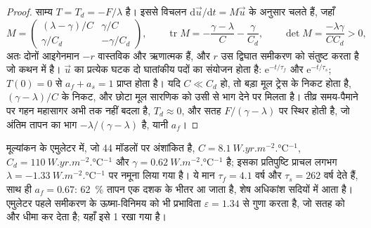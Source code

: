 \begin{proof}
साम्य $T = T_d = -F/\lambda$ है। इससे विचलन
$\mathrm d\vec u/\mathrm dt = M\vec u$ के अनुसार चलते हैं, जहाँ
\[
M = \begin{pmatrix} (\lambda - \gamma)/C & \gamma/C\\ \gamma/C_d &
-\gamma/C_d\end{pmatrix}, \qquad
\operatorname{tr}M = -\frac{\gamma - \lambda}{C} - \frac{\gamma}{C_d},
\qquad \det M = \frac{-\lambda\gamma}{CC_d} > 0 ,
\]
अतः दोनों आइगेनमान $-r$ वास्तविक और ऋणात्मक हैं, और $r$ उस द्विघात समीकरण को संतुष्ट करता है
जो कथन में है। $\vec u$ का प्रत्येक घटक दो घातांकीय पदों का संयोजन होता है: $\mathrm
e^{-t/\tau_f}$ और $\mathrm e^{-t/\tau_s}$; $T(0) = 0$ से $a_f + a_s =
1$ प्राप्त होता है। यदि $C \ll C_d$ हो, तो बड़ा मूल ट्रेस के निकट होता है, $(\gamma -
\lambda)/C$ के निकट, और छोटा मूल सारणिक को उसी से भाग देने पर मिलता है। तीव्र
समय-पैमाने पर गहन महासागर अभी तक नहीं बदला है, $T_d \approx 0$, और सतह
$F/(\gamma - \lambda)$ पर स्थिर होती है, जो अंतिम तापन का
भाग $-\lambda/(\gamma - \lambda)$ है, यानी $a_f$।
\end{proof}

मूल्यांकन के एमुलेटर में, जो 44 मॉडलों पर अंशांकित है, $C =
\qty{8.1}{W.yr.m^{-2}.\celsius^{-1}}$, $C_d = \qty{110}{W.yr.m^{-2}.\celsius^{-1}}$
और $\gamma = \qty{0.62}{W.m^{-2}.\celsius^{-1}}$ है; इसका प्रतिपुष्टि प्राचल
लगभग $\lambda = \qty{-1.33}{W.m^{-2}.\celsius^{-1}}$ पर नमूना लिया गया है। ये मान
$\tau_f = \num{4.1}\text{ वर्ष}$ और $\tau_s = \num{262}\text{ वर्ष}$ देते हैं, साथ ही $a_f =
0.67$: \qty{62}{\percent} तापन एक दशक के भीतर आ जाता है, शेष अधिकांश
सदियों में आता है। एमुलेटर पहले समीकरण के ऊष्मा-विनिमय को भी
प्रभाविता $\varepsilon = 1.34$ से गुणा करता है, जो सतह को
और धीमा कर देता है; यहाँ इसे 1 रखा गया है।

